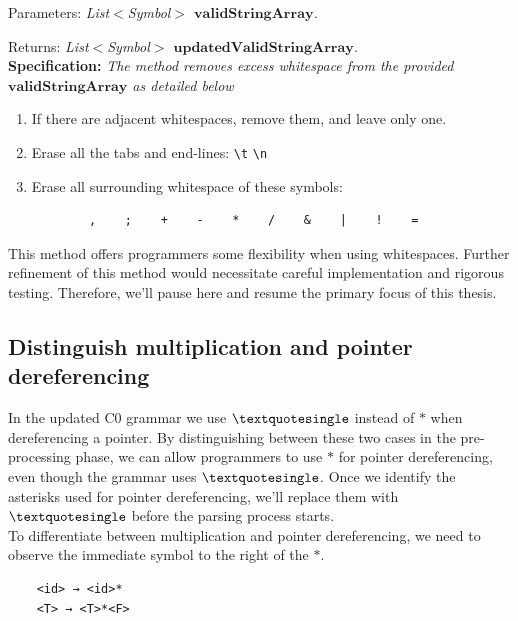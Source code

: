 Parameters: \textit{List\(<\)Symbol\(>\) \(\boldsymbol{validStringArray}\).}

Returns: \textit{List\(<\)Symbol\(>\) \(\boldsymbol{updatedValidStringArray}\).}\\

\textbf{Specification:} \textit{The method removes excess whitespace from the provided \(\boldsymbol{validStringArray}\) as detailed below}\\

\begin{enumerate}
    \item If there are adjacent whitespaces, remove them, and leave only one.
    \item Erase all the tabs and end-lines: \texttt{\textbackslash  t} \texttt{\textbackslash  n}
    \item Erase all surrounding whitespace of these symbols:
    \begin{verbatim}
        ,    ;    +    -    *    /    &    |    !    =
    \end{verbatim}
\end{enumerate}

This method offers programmers some flexibility when using whitespaces. Further refinement of this method would necessitate careful implementation and rigorous testing. Therefore, we'll pause here and resume the primary focus of this thesis.

\vspace{30pt}

\subsection{Distinguish multiplication and pointer dereferencing}

In the updated C0 grammar we use \(\textquotesingle\) instead of \(\ast\) when dereferencing a pointer. By distinguishing between these two cases in the pre-processing phase, we can allow programmers to use \(\ast\) for pointer dereferencing, even though the grammar uses \(\textquotesingle\). Once we identify the asterisks used for pointer dereferencing, we'll replace them with \(\textquotesingle\) before the parsing process starts.\\

To differentiate between multiplication and pointer dereferencing, we need to observe the immediate symbol to the right of the \(\ast\).

\begin{verbatim}
    <id> → <id>*
    <T> → <T>*<F>
\end{verbatim}

